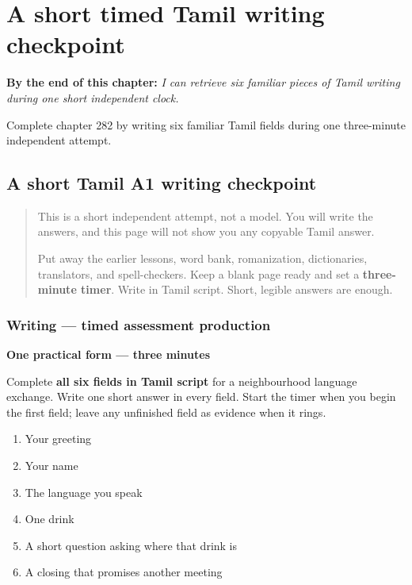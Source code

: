 
\chapter{A short timed Tamil writing checkpoint}
\label{ch:ta-a-short-timed-tamil-writing-checkpoint}

\begin{chapteropening}
\textbf{By the end of this chapter:} \emph{I can retrieve six familiar pieces of Tamil writing during one short independent clock.}

Complete chapter 282 by writing six familiar Tamil fields during one three-minute independent attempt.
\end{chapteropening}

\section[(short timed A1 writing checkpoint)]{A short Tamil A1 writing checkpoint}

\label{lesson:TA-W282-a1-timed-production}



\begin{quote}
This is a short independent attempt, not a model. You will write the answers, and this page will not show you any copyable Tamil answer.

Put away the earlier lessons, word bank, romanization, dictionaries, translators, and spell-checkers. Keep a blank page ready and set a \textbf{three-minute timer}. Write in Tamil script. Short, legible answers are enough.
\end{quote}

\subsection*{Writing — timed assessment production}
\textbf{One practical form — three minutes}

Complete \textbf{all six fields in Tamil script} for a neighbourhood language exchange. Write one short answer in every field. Start the timer when you begin the first field; leave any unfinished field as evidence when it rings.

\begin{enumerate}
\raggedright
  \item Your greeting
  \item Your name
  \item The language you speak
  \item One drink
  \item A short question asking where that drink is
  \item A closing that promises another meeting
\end{enumerate}

